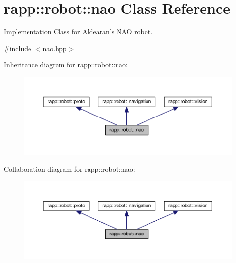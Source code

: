 \hypertarget{classrapp_1_1robot_1_1nao}{\section{rapp\-:\-:robot\-:\-:nao Class Reference}
\label{classrapp_1_1robot_1_1nao}
}


Implementation Class for Aldearan's N\-A\-O robot.  




{\ttfamily \#include $<$nao.\-hpp$>$}



Inheritance diagram for rapp\-:\-:robot\-:\-:nao\-:
\nopagebreak
\begin{figure}[H]
\begin{center}
\leavevmode
\includegraphics[width=350pt]{classrapp_1_1robot_1_1nao__inherit__graph}
\end{center}
\end{figure}


Collaboration diagram for rapp\-:\-:robot\-:\-:nao\-:
\nopagebreak
\begin{figure}[H]
\begin{center}
\leavevmode
\includegraphics[width=350pt]{classrapp_1_1robot_1_1nao__coll__graph}
\end{center}
\end{figure}
